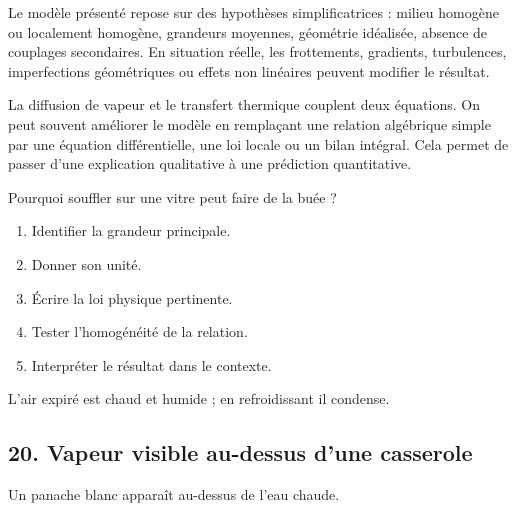 \documentclass[11pt,a4paper]{article}
\begin{document}
\begin{attentionbox}
Le modèle présenté repose sur des hypothèses simplificatrices : milieu homogène ou localement homogène, grandeurs moyennes, géométrie idéalisée, absence de couplages secondaires. En situation réelle, les frottements, gradients, turbulences, imperfections géométriques ou effets non linéaires peuvent modifier le résultat.
\end{attentionbox}

\begin{approfondissementbox}
La diffusion de vapeur et le transfert thermique couplent deux équations.
On peut souvent améliorer le modèle en remplaçant une relation algébrique simple par une équation différentielle, une loi locale ou un bilan intégral. Cela permet de passer d'une explication qualitative à une prédiction quantitative.
\end{approfondissementbox}

\begin{exercicebox}
Pourquoi souffler sur une vitre peut faire de la buée ?
\begin{enumerate}
  \item Identifier la grandeur principale.
  \item Donner son unité.
  \item Écrire la loi physique pertinente.
  \item Tester l'homogénéité de la relation.
  \item Interpréter le résultat dans le contexte.
\end{enumerate}
\end{exercicebox}

\begin{corrigebox}[Indication]
L'air expiré est chaud et humide ; en refroidissant il condense.
\end{corrigebox}


\subsection{20. Vapeur visible au-dessus d'une casserole}

\begin{exemplebox}
Un panache blanc apparaît au-dessus de l'eau chaude.
\end{exemplebox}
\end{document}
